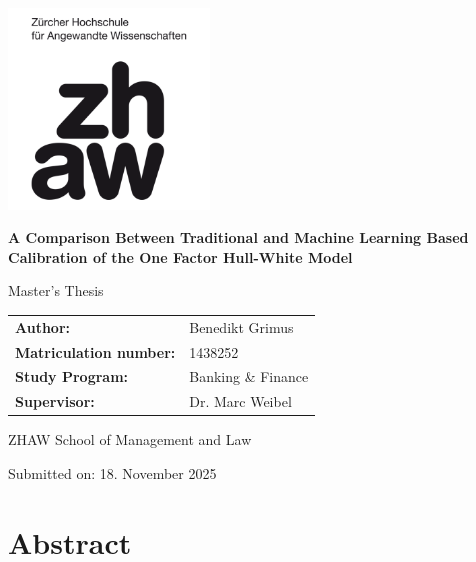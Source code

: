 \documentclass[12pt,a4paper]{article}
\begin{document}
\onehalfspacing

\begin{titlepage}
	\centering
	\includegraphics[width=0.4\textwidth]{images/zhaw_logo.png}
	\vfill
	{\Huge\bfseries A Comparison Between Traditional and Machine Learning Based Calibration of the One Factor Hull-White Model\par}
	{\Large Master's Thesis\par}
	\vspace{1.0cm}
	\vfill
	\begin{minipage}{0.8\textwidth}
		\large
		\begin{tabular}{@{}ll}
			\textbf{Author:}              & Benedikt Grimus    \\
			\textbf{Matriculation number:} & 1438252            \\
			\textbf{Study Program:}       & Banking \& Finance \\
			\textbf{Supervisor:}          & Dr. Marc Weibel    \\
		\end{tabular}
	\end{minipage}
	\vfill
	{\large
		ZHAW School of Management and Law\par
		Submitted on: 18. November 2025\par
	}
\end{titlepage}
\clearpage

\clearpage
{}
\section*{Abstract}

\clearpage

\tableofcontents
\clearpage
\newpage

\printacronyms
\newpage
\end{document}
